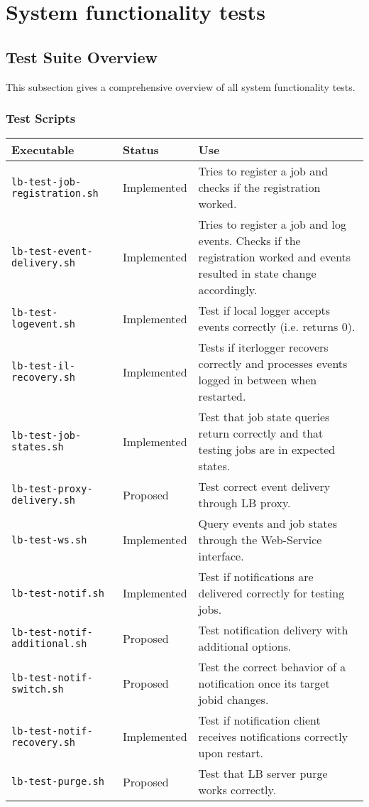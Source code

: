 
\section{System functionality tests}
\label{s:functionality}

\subsection{Test Suite Overview}

This subsection gives a comprehensive overview of all system functionality tests.

\subsubsection{Test Scripts}

\begin{tabularx}{\textwidth}{|l|l|X|}
\hline
     {\bf Executable} & {\bf Status} & {\bf Use} \\
\hline
{\tt lb-test-job-registration.sh} & Implemented & Tries to register a job and checks if the registration worked. \\
\hline
{\tt lb-test-event-delivery.sh} & Implemented & Tries to register a job and log events. Checks if the registration worked and events resulted in state change accordingly. \\
\hline
{\tt lb-test-logevent.sh} & Implemented & Test if local logger accepts events correctly (i.e. returns 0). \\
\hline
{\tt lb-test-il-recovery.sh} & Implemented & Tests if iterlogger recovers correctly and processes events logged in between when restarted. \\
\hline
{\tt lb-test-job-states.sh} & Implemented & Test that job state queries return correctly and that testing jobs are in expected states. \\
\hline
{\tt lb-test-proxy-delivery.sh} & Proposed & Test correct event delivery through LB proxy. \\
\hline
{\tt lb-test-ws.sh} & Implemented & Query events and job states through the Web-Service interface. \\
\hline
{\tt lb-test-notif.sh} & Implemented & Test if notifications are delivered correctly for testing jobs. \\
\hline
{\tt lb-test-notif-additional.sh} & Proposed & Test notification delivery with additional options. \\
\hline
{\tt lb-test-notif-switch.sh} & Proposed & Test the correct behavior of a notification once its target jobid changes.  \\
\hline
{\tt lb-test-notif-recovery.sh} & Implemented & Test if notification client receives notifications correctly upon restart.  \\
\hline
{\tt lb-test-purge.sh} & Proposed & Test that LB server purge works correctly. \\
\hline
\end{tabularx}

